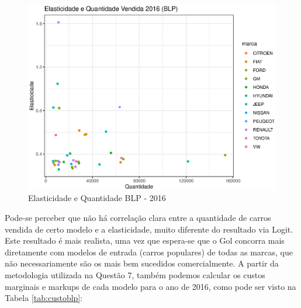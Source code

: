 \documentclass{article}
\begin{document}
\begin{figure}[H]
    \centering
    \includegraphics{figs and tabs/elasticitiesBLP.eps}
    \caption{Elasticidade e Quantidade BLP - 2016}
    \label{fig:elastblp}
\end{figure}

Pode-se perceber que não há correlação clara entre a quantidade de carros vendida de certo modelo e a elasticidade, muito diferente do resultado via Logit. Este resultado é mais realista, uma vez que espera-se que o Gol concorra mais diretamente com modelos de entrada (carros populares) de todas as marcas, que não necessariamente são os mais bem sucedidos comercialmente. A partir da metodologia utilizada na Questão 7, também podemos calcular os custos marginais e markups de cada modelo para o ano de 2016, como pode ser visto na Tabela \ref{tab:custoblp}:
\end{document}
